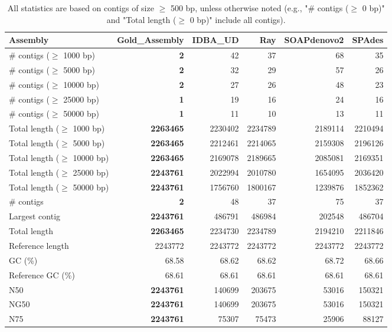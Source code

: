 \documentclass[12pt,a4paper]{article}
\begin{document}
\begin{table}[ht]
\begin{center}
\caption{All statistics are based on contigs of size $\geq$ 500 bp, unless otherwise noted (e.g., "\# contigs ($\geq$ 0 bp)" and "Total length ($\geq$ 0 bp)" include all contigs).}
\begin{tabular}{|l*{5}{|r}|}
\hline
Assembly & Gold\_Assembly & IDBA\_UD & Ray & SOAPdenovo2 & SPAdes \\ \hline
\# contigs ($\geq$ 1000 bp) & {\bf 2} & 42 & 37 & 68 & 35 \\ \hline
\# contigs ($\geq$ 5000 bp) & {\bf 2} & 32 & 29 & 57 & 26 \\ \hline
\# contigs ($\geq$ 10000 bp) & {\bf 2} & 27 & 26 & 48 & 23 \\ \hline
\# contigs ($\geq$ 25000 bp) & {\bf 1} & 19 & 16 & 24 & 16 \\ \hline
\# contigs ($\geq$ 50000 bp) & {\bf 1} & 11 & 10 & 13 & 11 \\ \hline
Total length ($\geq$ 1000 bp) & {\bf 2263465} & 2230402 & 2234789 & 2189114 & 2210494 \\ \hline
Total length ($\geq$ 5000 bp) & {\bf 2263465} & 2212461 & 2214065 & 2159308 & 2196126 \\ \hline
Total length ($\geq$ 10000 bp) & {\bf 2263465} & 2169078 & 2189665 & 2085081 & 2169351 \\ \hline
Total length ($\geq$ 25000 bp) & {\bf 2243761} & 2022994 & 2010780 & 1654095 & 2036420 \\ \hline
Total length ($\geq$ 50000 bp) & {\bf 2243761} & 1756760 & 1800167 & 1239876 & 1852362 \\ \hline
\# contigs & {\bf 2} & 48 & 37 & 75 & 37 \\ \hline
Largest contig & {\bf 2243761} & 486791 & 486984 & 202548 & 486704 \\ \hline
Total length & {\bf 2263465} & 2234730 & 2234789 & 2194210 & 2211846 \\ \hline
Reference length & 2243772 & 2243772 & 2243772 & 2243772 & 2243772 \\ \hline
GC (\%) & 68.58 & 68.62 & 68.62 & 68.72 & 68.66 \\ \hline
Reference GC (\%) & 68.61 & 68.61 & 68.61 & 68.61 & 68.61 \\ \hline
N50 & {\bf 2243761} & 140699 & 203675 & 53016 & 150321 \\ \hline
NG50 & {\bf 2243761} & 140699 & 203675 & 53016 & 150321 \\ \hline
N75 & {\bf 2243761} & 75307 & 75473 & 25906 & 88127 \\ \hline

\end{tabular}
\end{center}
\end{table}
\end{document}
